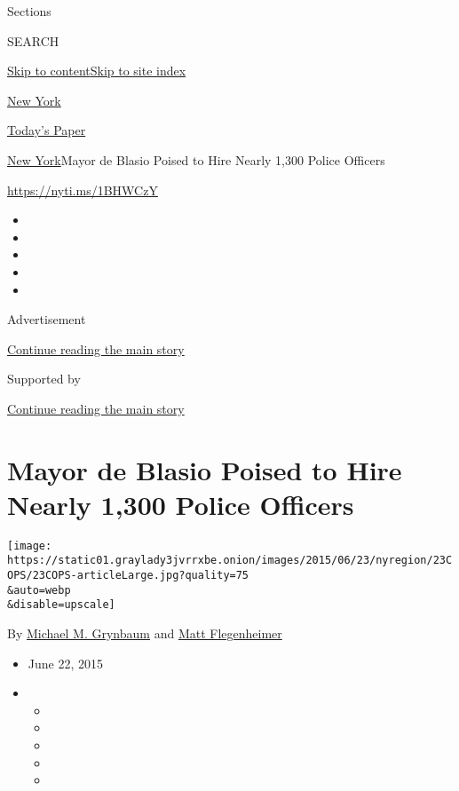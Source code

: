 Sections

SEARCH

\protect\hyperlink{site-content}{Skip to
content}\protect\hyperlink{site-index}{Skip to site index}

\href{https://www.nytimes3xbfgragh.onion/section/nyregion}{New York}

\href{https://myaccount.nytimes3xbfgragh.onion/auth/login?response_type=cookie\&client_id=vi}{}

\href{https://www.nytimes3xbfgragh.onion/section/todayspaper}{Today's
Paper}

\href{/section/nyregion}{New York}\textbar{}Mayor de Blasio Poised to
Hire Nearly 1,300 Police Officers

\url{https://nyti.ms/1BHWCzY}

\begin{itemize}
\item
\item
\item
\item
\item
\end{itemize}

Advertisement

\protect\hyperlink{after-top}{Continue reading the main story}

Supported by

\protect\hyperlink{after-sponsor}{Continue reading the main story}

\hypertarget{mayor-de-blasio-poised-to-hire-nearly-1300-police-officers}{%
\section{Mayor de Blasio Poised to Hire Nearly 1,300 Police
Officers}\label{mayor-de-blasio-poised-to-hire-nearly-1300-police-officers}}

\texttt{[image: https://static01.graylady3jvrrxbe.onion/images/2015/06/23/nyregion/23COPS/23COPS-articleLarge.jpg?quality=75\\\&auto=webp\\\&disable=upscale]}

By
\href{http://www.nytimes3xbfgragh.onion/by/michael-m-grynbaum}{Michael
M. Grynbaum} and
\href{http://www.nytimes3xbfgragh.onion/by/matt-flegenheimer}{Matt
Flegenheimer}

\begin{itemize}
\item
  June 22, 2015
\item
  \begin{itemize}
  \item
  \item
  \item
  \item
  \item
  \end{itemize}
\end{itemize}


